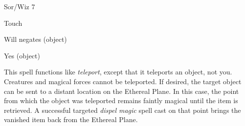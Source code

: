 
\begin{description*}
\item[Level:] Sor/Wiz 7
\item[Range:] Touch
\item[Saving Throw:] Will negates (object)
\item[Spell Resistance:] Yes (object)
\end{description*}

This spell functions like \textit{teleport}, except that it teleports an object,
not you. Creatures and magical forces cannot be teleported.
If desired, the target object can be sent to a distant location on the Ethereal
Plane. In this case, the point from which the object was teleported remains faintly
magical until the item is retrieved. A successful targeted \textit{dispel magic
}spell cast on that point brings the vanished item back from the Ethereal Plane.
